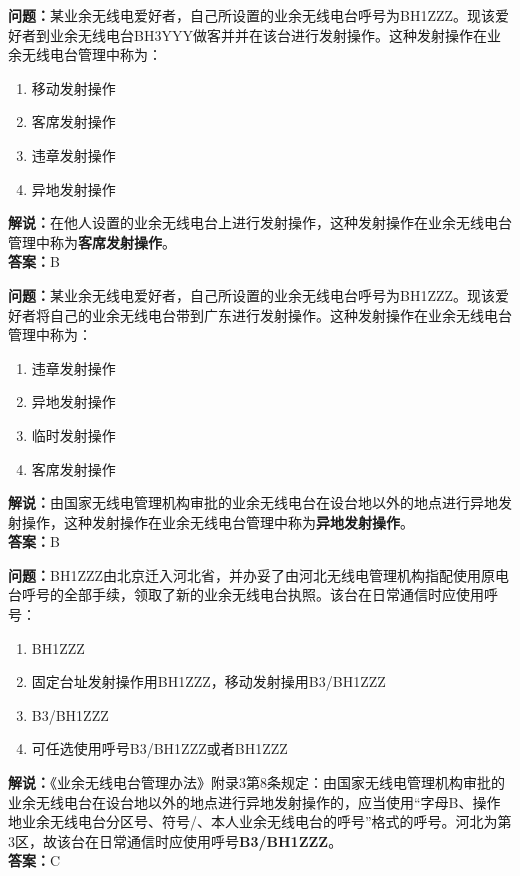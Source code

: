 \documentclass{ctexbook}
\begin{document}
\bigskip


\noindent\textbf{问题：}某业余无线电爱好者，自己所设置的业余无线电台呼号为BH1ZZZ。现该爱好者到业余无线电台BH3YYY做客并并在该台进行发射操作。这种发射操作在业余无线电台管理中称为：
\begin{enumerate}[label=\Alph*), leftmargin=3em]
	\item 移动发射操作
	\item 客席发射操作
	\item 违章发射操作
	\item 异地发射操作
\end{enumerate}
\noindent\textbf{解说：}在他人设置的业余无线电台上进行发射操作，这种发射操作在业余无线电台管理中称为\textbf{客席发射操作}。\\\noindent\textbf{答案：}B


\bigskip


\noindent\textbf{问题：}某业余无线电爱好者，自己所设置的业余无线电台呼号为BH1ZZZ。现该爱好者将自己的业余无线电台带到广东进行发射操作。这种发射操作在业余无线电台管理中称为：
\begin{enumerate}[label=\Alph*), leftmargin=3em]
	\item 违章发射操作
	\item 异地发射操作
	\item 临时发射操作
	\item 客席发射操作
\end{enumerate}
\noindent\textbf{解说：}由国家无线电管理机构审批的业余无线电台在设台地以外的地点进行异地发射操作，这种发射操作在业余无线电台管理中称为\textbf{异地发射操作}。\\\noindent\textbf{答案：}B





\bigskip


\noindent\textbf{问题：}BH1ZZZ由北京迁入河北省，并办妥了由河北无线电管理机构指配使用原电台呼号的全部手续，领取了新的业余无线电台执照。该台在日常通信时应使用呼号：
\begin{enumerate}[label=\Alph*), leftmargin=3em]
	\item BH1ZZZ
	\item 固定台址发射操作用BH1ZZZ，移动发射操用B3/BH1ZZZ
	\item B3/BH1ZZZ
	\item 可任选使用呼号B3/BH1ZZZ或者BH1ZZZ
\end{enumerate}
\noindent\textbf{解说：}《业余无线电台管理办法》附录3第8条规定：由国家无线电管理机构审批的业余无线电台在设台地以外的地点进行异地发射操作的，应当使用“字母B、操作地业余无线电台分区号、符号/、本人业余无线电台的呼号”格式的呼号。河北为第3区，故该台在日常通信时应使用呼号\textbf{B3/BH1ZZZ}。\\\noindent\textbf{答案：}C
\end{document}
